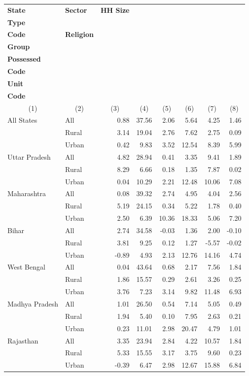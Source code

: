 \label{tab:Table 10}
\begin{tabular}{llrrrrrr}
\toprule
\textbf{State} & \textbf{Sector} & \textbf{HH Size} & \makecell{\textbf{HH}\\ \textbf{Type}\\ \textbf{Code}} & \textbf{Religion} &\makecell{\textbf{Social}\\ \textbf{Group}} & \makecell{\textbf{Land}\\ \textbf{Possessed}\\ \textbf{Code}} & \makecell{\textbf{Dwelling}\\ \textbf{Unit}\\ \textbf{Code}}\\
\multicolumn{1}{c}{(1)} & \multicolumn{1}{c}{(2)} & \multicolumn{1}{c}{(3)} & \multicolumn{1}{c}{(4)} & \multicolumn{1}{c}{(5)} & \multicolumn{1}{c}{(6)} & \multicolumn{1}{c}{(7)} & \multicolumn{1}{c}{(8)} \\
\midrule
All States & All & 0.88 & 37.56 & 2.06 & 5.64 & 4.25 & 1.46\\
 & Rural & 3.14 & 19.04 & 2.76 & 7.62 & 2.75 & 0.09\\
 & Urban & 0.42 & 9.83 & 3.52 & 12.54 & 8.39 & 5.99\\
\addlinespace
Uttar Pradesh & All & 4.82 & 28.94 & 0.41 & 3.35 & 9.41 & 1.89\\
 & Rural & 8.29 & 6.66 & 0.18 & 1.35 & 7.87 & 0.02\\
 & Urban & 0.04 & 10.29 & 2.21 & 12.48 & 10.06 & 7.08\\
\addlinespace
Maharashtra & All & 0.08 & 39.32 & 2.74 & 4.95 & 4.04 & 2.56\\
 & Rural & 5.19 & 24.15 & 0.34 & 5.22 & 1.78 & 0.40\\
 & Urban & 2.50 & 6.39 & 10.36 & 18.33 & 5.06 & 7.20\\
\addlinespace
Bihar & All & 2.74 & 34.58 & -0.03 & 1.36 & 2.00 & -0.10\\
 & Rural & 3.81 & 9.25 & 0.12 & 1.27 & -5.57 & -0.02\\
 & Urban & -0.89 & 4.93 & 2.13 & 12.76 & 14.16 & 4.74\\
\addlinespace
West Bengal & All & 0.04 & 43.64 & 0.68 & 2.17 & 7.56 & 1.84\\
 & Rural & 1.86 & 15.57 & 0.29 & 2.61 & 3.26 & 0.25\\
 & Urban & 3.76 & 7.23 & 3.14 & 9.82 & 11.48 & 6.93\\
\addlinespace
Madhya Pradesh & All & 1.01 & 26.50 & 0.54 & 7.14 & 5.05 & 0.49\\
 & Rural & 1.94 & 5.40 & 0.10 & 7.95 & 2.63 & 0.21\\
 & Urban & 0.23 & 11.01 & 2.98 & 20.47 & 4.79 & 1.01\\
\addlinespace
Rajasthan & All & 3.35 & 23.94 & 2.84 & 4.22 & 10.57 & 1.84\\
 & Rural & 5.33 & 15.55 & 3.17 & 3.75 & 9.60 & 0.23\\
 & Urban & -0.39 & 6.47 & 2.98 & 12.67 & 15.88 & 6.84\\
\bottomrule
\end{tabular}
